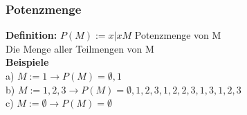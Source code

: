 \documentclass[11pt,a4paper]{article}
\begin{document}
\subsubsection{Potenzmenge}
\textbf{Definition:} $ P(M) := { x | x M } $ Potenzmenge von M\\
Die Menge aller Teilmengen von M\\
\textbf{Beispiele}\\
a) $ M:={1} \rightarrow P(M) = {\emptyset,{1}}$\\
b) $ M:= {1,2,3} \rightarrow P(M) = {\emptyset, {1},{2},{3},{1,2},{2,3},{1,3},{1,2,3}}$\\
c) $ M:= \emptyset \rightarrow P(M) = {\emptyset}$
\end{document}
